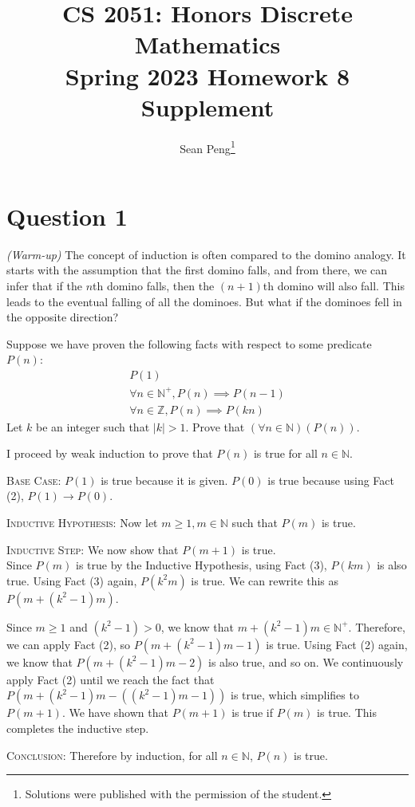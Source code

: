 \documentclass{article}
\title{\vspace{-1cm}CS 2051: Honors Discrete Mathematics \\Spring 2023 Homework 8 Supplement}
\author{Sean Peng\footnote{Solutions were published with the permission of the student.}}
\date{}
\begin{document}
\maketitle

\section*{Question 1}
    \textit{(Warm-up)} The concept of induction is often compared to the domino analogy. It starts with the assumption that the first domino falls, and from there, we can infer that if the $n$th domino falls, then the $(n + 1)$th domino will also fall. This leads to the eventual falling of all the dominoes. But what if the dominoes fell in the opposite direction? 
    
    \vspace{2mm}
    Suppose we have proven the following facts with respect to some predicate $P(n)$:
    \begin{gather}
        P(1) \\
        \forall n \in \mathbb{N}^{+}, P(n) \implies P(n - 1) \\
        \forall n \in \mathbb{Z}, P(n) \implies P(kn)
    \end{gather}
    Let $k$ be an integer such that $|k| > 1$. Prove that $(\forall n \in \mathbb{N})(P(n))$.
\begin{tcolorbox}
        I proceed by weak induction to prove that $P(n)$ is true for all $n \in \mathbb{N}$.

        \medskip
        \textsc{Base Case:} $P(1)$ is true because it is given. $P(0)$ is true because using Fact (2), $P(1) \rightarrow P(0)$. 

        \medskip
        \vspace{2mm}
        \textsc{Inductive Hypothesis:} Now let $m \geq 1, m \in \mathbb{N}$ such that $P(m)$ is true. 
        
        \medskip
        \vspace{2mm}
        \textsc{Inductive Step:} We now show that $P(m + 1)$ is true. \\
        Since $P(m)$ is true by the Inductive Hypothesis, using Fact (3), $P(km)$ is also true. Using Fact (3) again, $P(k^2m)$ is true. We can rewrite this as $P(m + (k^2 - 1)m)$. 

        \medskip
       Since $m \geq 1$ and $(k^2 - 1) > 0$, we know that $m + (k^2 - 1)m \in \mathbb{N}^+$. Therefore, we can apply Fact (2), so $P(m + (k^2 - 1)m - 1)$ is true. Using Fact (2) again, we know that $P(m + (k^2 - 1)m - 2)$ is also true, and so on. We continuously apply Fact (2) until we reach the fact that $P(m + (k^2 - 1)m - ((k^2-1)m-1))$ is true, which simplifies to $P(m + 1)$. We have shown that $P(m + 1)$ is true if $P(m)$ is true. This completes the inductive step.


        \vspace{2mm}
        \textsc{Conclusion:} Therefore by induction, for all $n \in \mathbb{N}$, $P(n)$ is true.
\end{tcolorbox}
\end{document}
